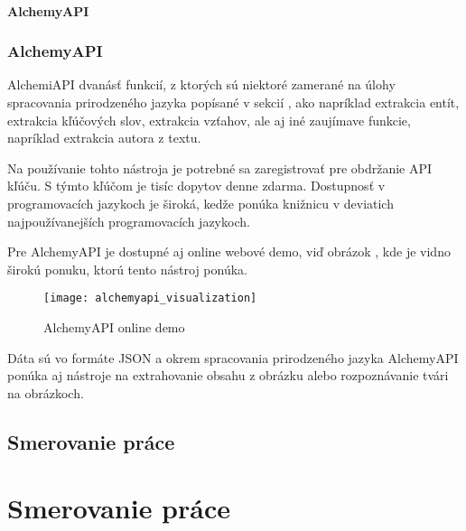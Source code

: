%
%
{
	\subsubsection{AlchemyAPI}
}
{
	\subsection{AlchemyAPI}
}
\label{subsubsec:alchemyapi}
AlchemiAPI dvanásť funkcií, z ktorých sú niektoré zamerané na úlohy spracovania prirodzeného jazyka popísané v sekcií , ako napríklad extrakcia entít, extrakcia kľúčových slov, extrakcia vzťahov, ale aj iné zaujímave funkcie, napríklad extrakcia autora z textu.

Na používanie tohto nástroja je potrebné sa zaregistrovať pre obdržanie API kľúču. S týmto kľúčom je tisíc dopytov denne zdarma. Dostupnosť v programovacích jazykoch je široká, kedže ponúka knižnicu v deviatich najpoužívanejších programovacích jazykoch.

Pre AlchemyAPI je dostupné aj online webové demo, viď obrázok , kde je vidno širokú ponuku, ktorú tento nástroj ponúka.

\begin{figure}[H]
\begin{center}\texttt{[image: alchemyapi\_visualization]}\end{center}
\caption[AlchemyAPI online demo]{AlchemyAPI online demo}\label{fig:alchemyapi_visualization}
\end{figure}

Dáta sú vo formáte JSON a okrem spracovania prirodzeného jazyka AlchemyAPI ponúka aj nástroje na extrahovanie obsahu z obrázku alebo rozpoznávanie tvári na obrázkoch.

%
%
{
	\section{Smerovanie práce} 
}
{
	\chapter{Smerovanie práce}
}



